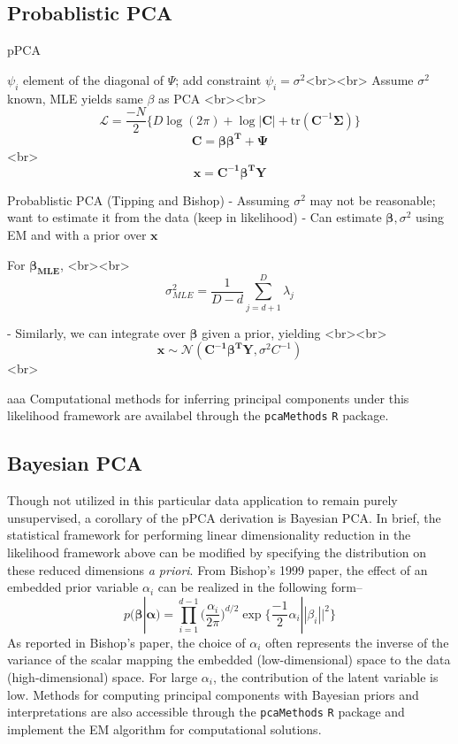 \documentclass[english, 11pt]{article}\usepackage[]{graphicx}\usepackage[]{color}
\begin{document}
\subsection{Probablistic PCA}

pPCA \cite{tipping1999probabilistic}

$\psi_i$ element of the diagonal of $\Psi$; add constraint $\psi_i = \sigma^2$<br><br>
Assume $\sigma^2$ known, MLE yields same $\beta$ as PCA <br><br>
$$  \mathcal{L} = \frac{-N}{2}\{ D\log(2\pi) + \log|\mathbf{C}| + \textrm{tr}(\mathbf{C}^{-1}\mathbf{\Sigma})  \}   $$
$$\mathbf{C} = \mathbf{\beta\beta^T }+ \mathbf{\Psi} $$ <br>
$$  \mathbf{x} = \mathbf{C^{-1}\beta^{T}Y}$$

Probablistic PCA (Tipping and Bishop)
- Assuming $\sigma^2$ may not be reasonable; want to estimate it from the data (keep in likelihood)
- Can estimate $\mathbf{\beta}, \sigma^2$ using EM and with a prior over $\mathbf{x}$

For  $\mathbf{\beta_{\textrm{MLE}}}$, <br><br> $$\sigma_{MLE}^2 = \frac{1}{D-d} \sum_{j = d +1}^D \lambda_j $$

- Similarly, we can integrate over $\mathbf{\beta}$ given a prior, yielding <br><br>
$$  \mathbf{x} \sim  \mathcal{N} (\mathbf{C^{-1}\beta^{T}Y}, \sigma^2C^{-1})$$ <br>

aaa \newline \newline
\noindent Computational methods for inferring principal components under this likelihood framework are availabel through the \texttt{pcaMethods} \texttt{R} package.

\subsection{Bayesian PCA}
Though not utilized in this particular data application to remain purely unsupervised, a corollary of the pPCA derivation is Bayesian PCA. In brief, the statistical framework for performing linear dimensionality reduction in the likelihood framework above can be modified by specifying the distribution on these reduced dimensions \textit{a priori}. \cite{bishop1999bayesian} From Bishop's 1999 paper, \cite{bishop1999bayesian} the effect of an embedded prior variable $\alpha_i$ can be realized in the following form--
$$p(\mathbf{\beta} |  \mathbf{\alpha}) = \prod_{i=1}^{d-1}\Big( \frac{\alpha_i}{2 \pi} \Big)^{d/2} \exp \Big \{ \frac{-1}{2}\alpha_i||\beta_i||^2\Big \}$$
As reported in Bishop's paper, the choice of $\alpha_i$ often represents the inverse of the variance of the scalar mapping the embedded (low-dimensional) space to the data (high-dimensional) space. For large $\alpha_i$, the contribution of the latent variable is low. Methods for computing principal components with Bayesian priors and interpretations are also accessible through the \texttt{pcaMethods} \texttt{R} package and implement the EM algorithm \cite{dempster1977maximum} for computational solutions. 
\end{document}
